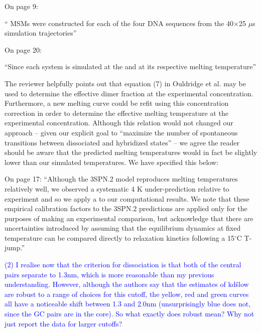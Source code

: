 \documentclass[11pt,a4paper]{letter} %
\newcommand*{\rood}[1]{{\color{red}{#1}}}
\newcommand*{\roodr}[1]{{\color{red}{#1}}}
\begin{document}
On page 9:

`` MSMs were constructed for each of the four DNA sequences \roodr{at their respective 3SPN.2 melting temperatures at 7 mM concentration} from the 40$\times$25 $\mu$s simulation trajectories''

On page 20:

``Since each system is simulated at the \roodr{same 7 mM concentration} and at its respective melting temperature''


The reviewer helpfully points out that equation (7) in Ouldridge et al. \cite{Ouldridge2010ExtractingSimulations} may be used to determine the effective dimer fraction at the experimental concentration. Furthermore, a new melting curve could be refit using this concentration correction in order to determine the effective melting temperature at the experimental concentration. Although this relation would not changed our approach -- given our explicit goal to ``maximize the number of spontaneous transitions between dissociated and hybridized states'' -- we agree the reader should be aware that the predicted melting temperatures would in fact be slightly lower than our simulated temperatures. We have specified this below:

On page 17:
``Although the 3SPN.2 model reproduces melting temperatures relatively well, we observed a systematic 4 K under-prediction relative to experiment and so we apply a \rood{universal (+4) K corrective temperature shift} to our computational results. \roodr{We note that we would expect the model to slightly over-predict melting temperature due to the 3.5$\times$ higher concentration relative to experiment, however the systematic shift shows that relative sequence-dependent trends are well maintained. Furthermore,} We note that these empirical calibration factors to the 3SPN.2 predictions are applied only for the purposes of making an experimental comparison, but acknowledge that there are uncertainties introduced by assuming that the equilibrium dynamics at fixed temperature can be compared directly to relaxation kinetics following a 15$^\circ$C T-jump.''


\textcolor{blue}{
(2) I realise now that the criterion for dissociation is that both of the central pairs separate to 1.3nm, which is more reasonable than my previous understanding. However, although the authors say that the estimates of kd\^slow are robust to a range of choices for this cutoff, the yellow, red and green curves all have a noticeable shift between 1.3 and 2.0nm (unsurprisingly blue does not, since the GC pairs are in the core). So what exactly does robust mean? Why not just report the data for larger cutoffs?
}
\end{document}
